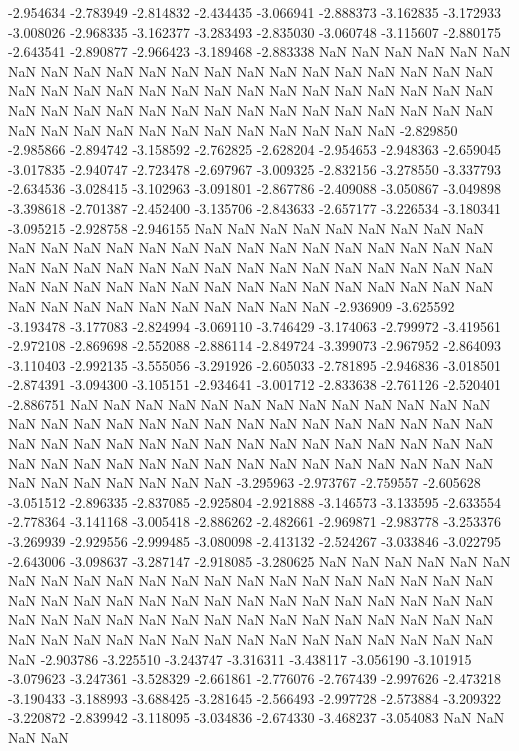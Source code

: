 -2.954634
-2.783949
-2.814832
-2.434435
-3.066941
-2.888373
-3.162835
-3.172933
-3.008026
-2.968335
-3.162377
-3.283493
-2.835030
-3.060748
-3.115607
-2.880175
-2.643541
-2.890877
-2.966423
-3.189468
-2.883338
NaN
NaN
NaN
NaN
NaN
NaN
NaN
NaN
NaN
NaN
NaN
NaN
NaN
NaN
NaN
NaN
NaN
NaN
NaN
NaN
NaN
NaN
NaN
NaN
NaN
NaN
NaN
NaN
NaN
NaN
NaN
NaN
NaN
NaN
NaN
NaN
NaN
NaN
NaN
NaN
NaN
NaN
NaN
NaN
NaN
NaN
NaN
NaN
NaN
NaN
NaN
NaN
NaN
NaN
NaN
NaN
NaN
NaN
NaN
NaN
NaN
NaN
NaN
-2.829850
-2.985866
-2.894742
-3.158592
-2.762825
-2.628204
-2.954653
-2.948363
-2.659045
-3.017835
-2.940747
-2.723478
-2.697967
-3.009325
-2.832156
-3.278550
-3.337793
-2.634536
-3.028415
-3.102963
-3.091801
-2.867786
-2.409088
-3.050867
-3.049898
-3.398618
-2.701387
-2.452400
-3.135706
-2.843633
-2.657177
-3.226534
-3.180341
-3.095215
-2.928758
-2.946155
NaN
NaN
NaN
NaN
NaN
NaN
NaN
NaN
NaN
NaN
NaN
NaN
NaN
NaN
NaN
NaN
NaN
NaN
NaN
NaN
NaN
NaN
NaN
NaN
NaN
NaN
NaN
NaN
NaN
NaN
NaN
NaN
NaN
NaN
NaN
NaN
NaN
NaN
NaN
NaN
NaN
NaN
NaN
NaN
NaN
NaN
NaN
NaN
NaN
NaN
NaN
NaN
NaN
NaN
NaN
NaN
NaN
NaN
NaN
NaN
NaN
NaN
NaN
NaN
-2.936909
-3.625592
-3.193478
-3.177083
-2.824994
-3.069110
-3.746429
-3.174063
-2.799972
-3.419561
-2.972108
-2.869698
-2.552088
-2.886114
-2.849724
-3.399073
-2.967952
-2.864093
-3.110403
-2.992135
-3.555056
-3.291926
-2.605033
-2.781895
-2.946836
-3.018501
-2.874391
-3.094300
-3.105151
-2.934641
-3.001712
-2.833638
-2.761126
-2.520401
-2.886751
NaN
NaN
NaN
NaN
NaN
NaN
NaN
NaN
NaN
NaN
NaN
NaN
NaN
NaN
NaN
NaN
NaN
NaN
NaN
NaN
NaN
NaN
NaN
NaN
NaN
NaN
NaN
NaN
NaN
NaN
NaN
NaN
NaN
NaN
NaN
NaN
NaN
NaN
NaN
NaN
NaN
NaN
NaN
NaN
NaN
NaN
NaN
NaN
NaN
NaN
NaN
NaN
NaN
NaN
NaN
NaN
NaN
NaN
NaN
NaN
NaN
NaN
NaN
NaN
NaN
-3.295963
-2.973767
-2.759557
-2.605628
-3.051512
-2.896335
-2.837085
-2.925804
-2.921888
-3.146573
-3.133595
-2.633554
-2.778364
-3.141168
-3.005418
-2.886262
-2.482661
-2.969871
-2.983778
-3.253376
-3.269939
-2.929556
-2.999485
-3.080098
-2.413132
-2.524267
-3.033846
-3.022795
-2.643006
-3.098637
-3.287147
-2.918085
-3.280625
NaN
NaN
NaN
NaN
NaN
NaN
NaN
NaN
NaN
NaN
NaN
NaN
NaN
NaN
NaN
NaN
NaN
NaN
NaN
NaN
NaN
NaN
NaN
NaN
NaN
NaN
NaN
NaN
NaN
NaN
NaN
NaN
NaN
NaN
NaN
NaN
NaN
NaN
NaN
NaN
NaN
NaN
NaN
NaN
NaN
NaN
NaN
NaN
NaN
NaN
NaN
NaN
NaN
NaN
NaN
NaN
NaN
NaN
NaN
NaN
NaN
NaN
NaN
NaN
NaN
NaN
NaN
-2.903786
-3.225510
-3.243747
-3.316311
-3.438117
-3.056190
-3.101915
-3.079623
-3.247361
-3.528329
-2.661861
-2.776076
-2.767439
-2.997626
-2.473218
-3.190433
-3.188993
-3.688425
-3.281645
-2.566493
-2.997728
-2.573884
-3.209322
-3.220872
-2.839942
-3.118095
-3.034836
-2.674330
-3.468237
-3.054083
NaN
NaN
NaN
NaN
